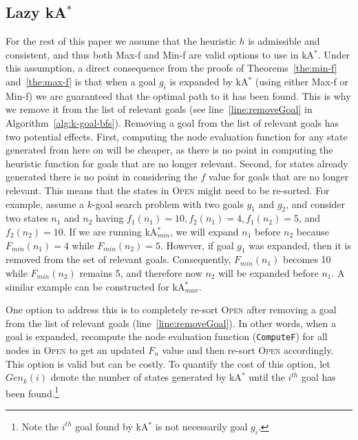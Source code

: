 \documentclass{aicom2e}
\newcommand{\kgs}{$k$-goal search}
\newcommand{\kastar}{kA$^*$}
\newcommand{\kastarmin}{kA$^*_{min}$}
\newcommand{\kastarmax}{kA$^*_{max}$}
\newcommand{\minf}{Min-f}
\newcommand{\maxf}{Max-f}
\newcommand{\open}{\textsc{Open}}
\begin{document}
\subsection{Lazy \kastar{}}
\label{sec:lazy}

For the rest of this paper we assume that the heuristic $h$ is admissible and consistent, and thus both \maxf{} and \minf{} are valid options to use in \kastar{}. Under this assumption, a direct consequence from the proofs of Theorems~\ref{the:min-f} and~\ref{the:max-f} is that when a goal $g_i$ is expanded by \kastar{} (using either \maxf{} or \minf{}) we are guaranteed that the optimal path to it has been found. This is why we remove it from the list of relevant goals (see line~\ref{line:removeGoal} in Algorithm~\ref{alg:k-goal-bfs}). Removing a goal from the list of relevant goals has two potential effects. First, computing the node evaluation function for any state generated from here on will be cheaper, as there is no point in computing the heuristic function for goals that are no longer relevant. Second, for states already generated there is no point in considering the $f$ value for goals that are no longer relevant. This means that the states in \open{} might need to be re-sorted. For example, assume a \kgs{} problem with two goals $g_1$ and $g_2$, and consider two states $n_1$ and $n_2$ having $f_1(n_1)=10, f_2(n_1)=4, f_1(n_2)=5$, and $f_2(n_2)=10$. If we are running \kastarmin{}, we will expand $n_1$ before $n_2$ because $F_{min}(n_1)=4$ while $F_{min}(n_2)=5$. However, if goal $g_1$ was expanded, then it is removed from the set of relevant goals. Consequently, $F_{min}(n_1)$ becomes 10 while $F_{min}(n_2)$ remains 5, and therefore now $n_2$ will be expanded before $n_1$. A similar example can be constructed for \kastarmax{}.



One option to address this is to completely re-sort \open{} after removing a goal from the list of relevant goals (line~\ref{line:removeGoal}). 
In other words, when a goal is expanded, recompute the node evaluation function ({\tt ComputeF}) for all nodes in \open{} to get an updated $F_n$ value and then  re-sort \open{} accordingly. 
This option is valid but can be costly. To quantify the cost of this option, 
let $Gen_k(i)$ denote the number of states generated by \kastar{} until the $i^{th}$ goal has been found.\footnote{Note the $i^{th}$ goal found by \kastar{} is not necessarily goal $g_i$.} 
\end{document}
